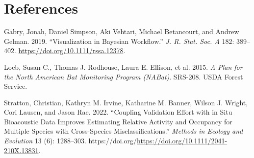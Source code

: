 \documentclass[
]{article}
\newlength{\cslhangindent}
\newenvironment{CSLReferences}[2] %
 {\begin{list}{}{%
  \setlength{\itemindent}{0pt}
  \setlength{\leftmargin}{0pt}
  \setlength{\parsep}{0pt}
  \ifodd #1
   \setlength{\leftmargin}{\cslhangindent}
   \setlength{\itemindent}{-1\cslhangindent}
  \fi
  \setlength{\itemsep}{#2\baselineskip}}}
 {\end{list}}
\begin{document}
\section*{References}\label{references}

\protect{}\label{refs}
\begin{CSLReferences}{1}{1}
Gabry, Jonah, Daniel Simpson, Aki Vehtari, Michael Betancourt, and Andrew Gelman. 2019. {``Visualization in Bayesian Workflow.''} \emph{J. R. Stat. Soc. A} 182: 389--402. \url{https://doi.org/10.1111/rssa.12378}.

Loeb, Susan C., Thomas J. Rodhouse, Laura E. Ellison, et al. 2015. \emph{A Plan for the {N}orth {A}merican Bat Monitoring Program ({NAB}at)}. SRS-208. USDA Forest Service.

Stratton, Christian, Kathryn M. Irvine, Katharine M. Banner, Wilson J. Wright, Cori Lausen, and Jason Rae. 2022. {``Coupling Validation Effort with in Situ Bioacoustic Data Improves Estimating Relative Activity and Occupancy for Multiple Species with Cross-Species Misclassifications.''} \emph{Methods in Ecology and Evolution} 13 (6): 1288--303. https://doi.org/\url{https://doi.org/10.1111/2041-210X.13831}.

\end{CSLReferences}
\end{document}
